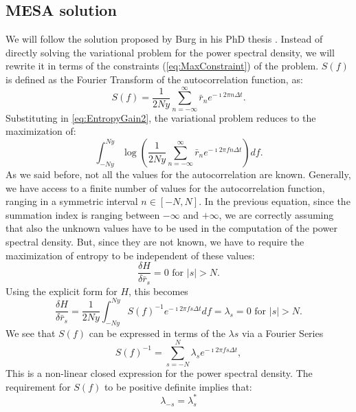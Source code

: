 \documentclass[twocolumn,showpacs,preprintnumbers,nofootinbib,prd,
superscriptaddress,10pt]{revtex4-1}
\begin{document}
\subsection{MESA solution}
We will follow the solution proposed by Burg in his PhD thesis \cite{burg1975maximum}. Instead of directly solving the variational problem for the power spectral density, we will rewrite it in terms of the constraints (\ref{eq:MaxConstraint}) of the problem. $S(f)$ is defined as the Fourier Transform of the autocorrelation function, as: 
\begin{equation}
    S(f) = \frac{1}{2 Ny}\sum_{n = -\infty}^{\infty} \bar r_n e^{- \imath 2 \pi n \Delta t}.
\end{equation}
Substituting in \ref{eq:EntropyGain2}, the variational problem reduces to the maximization of: 
\begin{equation}
    \int_{-Ny}^{Ny}  
    \log\left(\frac{1}{2 Ny}\sum_{n = -\infty}^{\infty} \bar r_n e^{-\imath 2 \pi f n \Delta t} 
    \right) df.
\end{equation}
As we said before, not all the values for the autocorrelation are known. Generally, we have access to a finite number of values for the autocorrelation function, ranging in a symmetric interval $n \in [-N, N]$. 
In the previous equation, since the summation index is ranging between $-\infty$ and $+\infty$, we are correctly assuming that also the unknown values have to be used in the computation of the power spectral density. But, since they are not known, we have to require the maximization of entropy to be independent of these values:
\begin{equation}\nonumber 
    \frac{\delta H}{\delta \bar r_s} = 0 \text{ for } \vert s \vert > N. 
\end{equation}
Using the explicit form for $H$, this becomes
\begin{equation}
      \frac{\delta H}{\delta \bar r_s} = \frac{1}{2Ny}\int_{-Ny}^{Ny} S(f)^{-1}e^{-\imath 2 \pi f s \Delta t } df = \lambda_s = 0 \text{ for } \vert s \vert > N. 
\end{equation}
We see that $S(f)$ can be expressed in terms of the $\lambda s$ via a Fourier Series
\begin{equation}\label{eq:PSDconstraint}
    S(f)^{-1} = \sum_{s = -N}^N \lambda_s e^{-\imath 2 \pi f s \Delta t},
\end{equation}
This is a non-linear closed expression for the power spectral density. The requirement for $S(f)$ to be positive definite implies that: 
\begin{equation}
    \nonumber 
    \lambda_{-s} = \lambda_s^* 
\end{equation}
\end{document}
